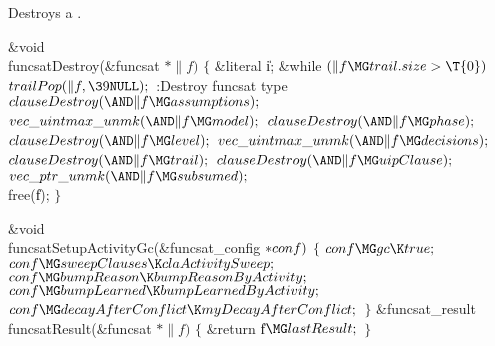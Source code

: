 {{{{{Destroys a .

\Y\B\&{void} \\{funcsatDestroy}(\&{funcsat} ${}{*}\|f){}$\1\1\2\2\6
${}\{{}$\1\6
\&{literal} \|i;\7
\&{while} ${}(\|f\MG\\{trail}.\\{size}>\T{0}){}$\1\5
${}\\{trailPop}(\|f,\39\NULL);{}$\2\6
:Destroy funcsat type\X\6
${}\\{clauseDestroy}({\AND}\|f\MG\\{assumptions});{}$\6
${}\\{vec\_uintmax\_unmk}({\AND}\|f\MG\\{model});{}$\6
${}\\{clauseDestroy}({\AND}\|f\MG\\{phase});{}$\6
${}\\{clauseDestroy}({\AND}\|f\MG\\{level});{}$\6
${}\\{vec\_uintmax\_unmk}({\AND}\|f\MG\\{decisions});{}$\6
${}\\{clauseDestroy}({\AND}\|f\MG\\{trail});{}$\6
${}\\{clauseDestroy}({\AND}\|f\MG\\{uipClause});{}$\6
${}\\{vec\_ptr\_unmk}({\AND}\|f\MG\\{subsumed});{}$\6
\\{free}(\|f);\6
\4${}\}{}$\2\par
\fi


\Y\B\&{void} \\{funcsatSetupActivityGc}(\&{funcsat\_config} ${}{*}\\{conf}){}$%
\1\1\2\2\6
${}\{{}$\1\6
${}\\{conf}\MG\\{gc}\K\\{true};{}$\6
${}\\{conf}\MG\\{sweepClauses}\K\\{claActivitySweep};{}$\6
${}\\{conf}\MG\\{bumpReason}\K\\{bumpReasonByActivity};{}$\6
${}\\{conf}\MG\\{bumpLearned}\K\\{bumpLearnedByActivity};{}$\6
${}\\{conf}\MG\\{decayAfterConflict}\K\\{myDecayAfterConflict};{}$\6
\4${}\}{}$\2\7
\&{funcsat\_result} \\{funcsatResult}(\&{funcsat} ${}{*}\|f){}$\1\1\2\2\6
${}\{{}$\1\6
\&{return} \|f${}\MG\\{lastResult};{}$\6
\4${}\}{}$\2\par
\fi

}}}}}
